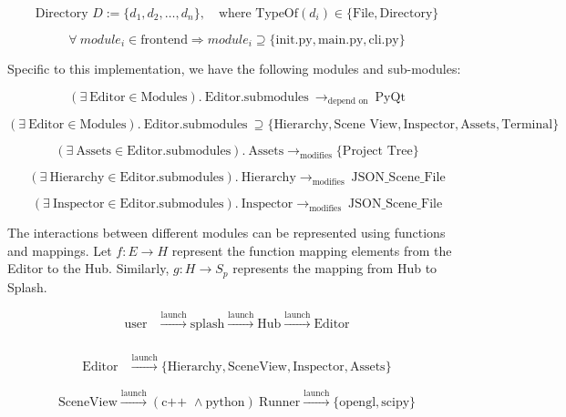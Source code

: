 

  
  \[
    \text{Directory } D := \{d_1, d_2, \ldots, d_n\}, \quad \text{where } \text{TypeOf}(d_i) \in \{\text{File}, \text{Directory}\}
  \]
  
  \[
    \forall \ module_i \in \text{frontend} \Rightarrow 
    module_i \supseteq \{\text{init.py}, \text{main.py}, \text{cli.py}\}
  \]
  
  Specific to this implementation, we have the following modules and sub-modules:
  
  \[
    (\exists \ \text{Editor} \in \text{Modules}). \ \text{Editor.submodules} \
    \rightarrow_{\text{depend on}} \ \text{PyQt}
  \]
  
  \[
    (\exists \ \text{Editor} \in \text{Modules}). \ \text{Editor.submodules} \
    \supseteq \{\text{Hierarchy}, \text{Scene View}, \text{Inspector}, \text{Assets}, \text{Terminal}\}
  \]
  
  \[
    (\exists \ \text{Assets} \in \text{Editor.submodules}). \ \text{Assets} \rightarrow_{\text{modifies}} \{\text{Project Tree}\} 
  \]
  
  \[
    (\exists \ \text{Hierarchy} \in \text{Editor.submodules}). \ \text{Hierarchy} \rightarrow_{\text{modifies}} \ \text{JSON\_Scene\_File}
  \]
  
  \[
    (\exists \ \text{Inspector} \in \text{Editor.submodules}). \ \text{Inspector} \rightarrow_{\text{modifies}} \ \text{JSON\_Scene\_File}
  \]
  
  The interactions between different modules can be represented using functions and mappings. Let \( f: E \to H \) represent the function mapping elements from the Editor to the Hub. 
  Similarly, \( g: H \to S_p \) represents the mapping from Hub to Splash.
  
  \[
  \begin{aligned}
    \text{user} &\xrightarrow{\text{launch}} \text{splash}     
         \xrightarrow{\text{launch}} \text{Hub}          
         \xrightarrow{\text{launch}} \text{Editor} \\
  \end{aligned}
  \]
 
  \[
  \begin{aligned}
        \text{Editor}  &\xrightarrow{\text{launch}} \{\text{Hierarchy}, \text{SceneView}, \text{Inspector}, \text{Assets}\}
  \end{aligned}
  \]

  \[
  \text{SceneView} \xrightarrow{\text{launch}} (\text{c++ } \land \text{python}) \ \text{Runner} \xrightarrow{\text{launch}} \{\text{opengl}, \text{scipy}\}
  \]
  
